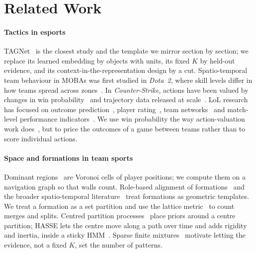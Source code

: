\section{Related Work}
\label{sec:related}

\paragraph*{Tactics in esports}
TAGNet~\cite{zhang2026tagnet} is the closest study and the template we mirror section by section; we replace its learned embedding by objects with units, its fixed $K$ by held-out evidence, and its context-in-the-representation design by a cut.
Spatio-temporal team behaviour in MOBAs was first studied in \emph{Dota~2}, where skill levels differ in how teams spread across zones~\cite{drachen2014skill}.
In \emph{Counter-Strike}, actions have been valued by changes in win probability~\cite{xenopoulos2020valuing} and trajectory data released at scale~\cite{xenopoulos2022esta}.
LoL research has focused on outcome prediction~\cite{hodge2021win,yang2022predicting}, player rating~\cite{maymin2020smart,debois2025pandaskill}, team networks~\cite{mora2019team} and match-level performance indicators~\cite{novak2020performance}.
We use win probability the way action-valuation work does~\cite{decroos2019actions,xenopoulos2020valuing}, but to price the outcomes of a game between teams rather than to score individual actions.

\paragraph*{Space and formations in team sports}
Dominant regions~\cite{taki2000visualization} are Voronoi cells of player positions; we compute them on a navigation graph so that walls count.
Role-based alignment of formations~\cite{lucey2013representing,bialkowski2014large} and the broader spatio-temporal literature~\cite{gudmundsson2017spatio} treat formations as geometric templates.
We treat a formation as a set partition and use the lattice metric~\cite{monjardet1981metrics} to count merges and splits.
Centred partition processes~\cite{paganin2021centered} place priors around a centre partition; HASSE lets the centre move along a path over time and adds rigidity and inertia, inside a sticky HMM~\cite{fox2011sticky}.
Sparse finite mixtures~\cite{fruhwirth2019here} motivate letting the evidence, not a fixed $K$, set the number of patterns.

